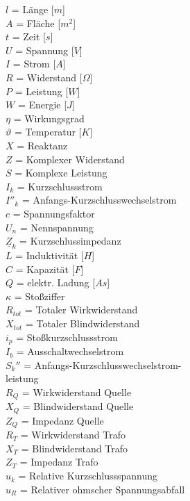 \documentclass[11pt, a4paper, draft, fleqn, twocolumn]{article}
\numberwithin{equation}{subsection}
\begin{document}
    \noindent
    $l$ = Länge [$m$] \\
    $A$ = Fläche [$m^2$] \\
    $t$ = Zeit [$s$] \\
    $U$ = Spannung [$V$] \\
    $I$ = Strom [$A$] \\
    $R$ = Widerstand [$\Omega$] \\
    $P$ = Leistung [$W$] \\
    $W$ = Energie [$J$] \\
    $\eta$ = Wirkungsgrad \\
    $\vartheta$ = Temperatur [$K$]\\
    $X$ = Reaktanz \\
    $Z$ = Komplexer Widerstand \\
    $S$ = Komplexe Leistung \\
    $I_k$ = Kurzschlussstrom \\
    $I''_k$ = Anfangs-Kurzschlusswechselstrom \\
    $c$ = Spannungsfaktor \\
    $U_n$ = Nennspannung \\
    $\underline{Z}_k$ = Kurzschlussimpedanz \\
    $L$ = Induktivität [$H$] \\
    $C$ = Kapazität [$F$] \\
    $Q$ = elektr. Ladung [$As$] \\
    $\kappa$ = Stoßziffer \\
    $R_{tot}$ = Totaler Wirkwiderstand \\
    $X_{tot}$ = Totaler Blindwiderstand \\
    $i_p$ = Stoßkurzschlussstrom \\
    $I_b$ = Ausschaltwechselstrom \\
    $S_k''$ = Anfangs-Kurzschlusswechselstrom- \\
    \indent \hspace{1.3em} leistung \\
    $R_Q$ = Wirkwiderstand Quelle \\
    $X_Q$ = Blindwiderstand Quelle \\
    $Z_Q$ = Impedanz Quelle \\
    $R_T$ = Wirkwiderstand Trafo \\
    $X_T$ = Blindwiderstand Trafo \\
    $Z_T$ = Impedanz Trafo \\
    $u_k$ = Relative Kurzschlussspannung \\
    $u_R$ = Relativer ohmscher Spannungsabfall \\
    
\end{document}
